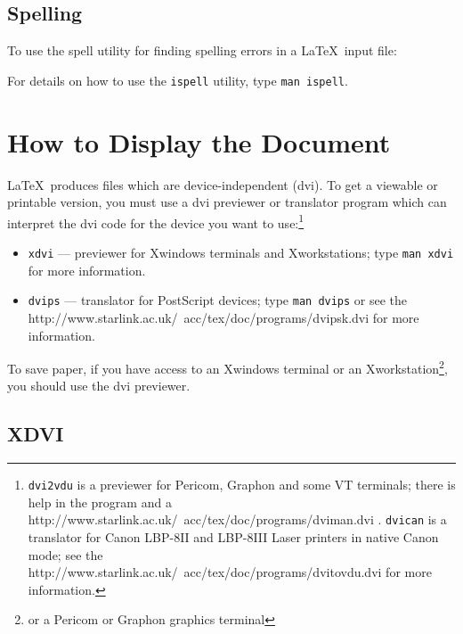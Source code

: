 \documentclass[11pt,twoside,nolof]{starlink}
\begin{document}
\subsection{Spelling}
\label{se:unixspell}
To use the spell utility for finding spelling errors in a \LaTeX\ input file:
\begin{terminalv}
\end{terminalv}

For details on how to use the \texttt{ispell} utility, type \texttt{man ispell}.

\section{\label{how_to_display_the_document}How to Display the Document}

\LaTeX\ produces files which are device-independent (dvi). To get a
viewable or printable version, you must use a dvi previewer or translator
program which can interpret the dvi code for the device you want to use:\footnote{
\texttt{dvi2vdu} is a previewer for Pericom, Graphon and some VT terminals;
                  there is help in the program and a
    {http://www.starlink.ac.uk/~acc/tex/doc/programs/dviman.dvi}
    \cite{dvican}.
\texttt{dvican} is a translator for Canon LBP-8II and LBP-8III Laser
                 printers in native Canon mode; see the
    {http://www.starlink.ac.uk/~acc/tex/doc/programs/dvitovdu.dvi}
    \cite{dvi2vdu}
    for more information.}

\begin{itemize}
\item \texttt{xdvi} --- previewer for Xwindows terminals and Xworkstations;
                     type \texttt{man xdvi} for more information.
\item \texttt{dvips} --- translator for PostScript devices; type \texttt{man dvips}
                  or see the
    {http://www.starlink.ac.uk/~acc/tex/doc/programs/dvipsk.dvi}\cite{dvips}
    for more information.
\end{itemize}

To save paper, if you have access to
an Xwindows terminal or an Xworkstation\footnote{or a Pericom or Graphon
graphics terminal}, you should use the dvi previewer.

\subsection{XDVI}
\label{se:dvixdvi}
\end{document}
